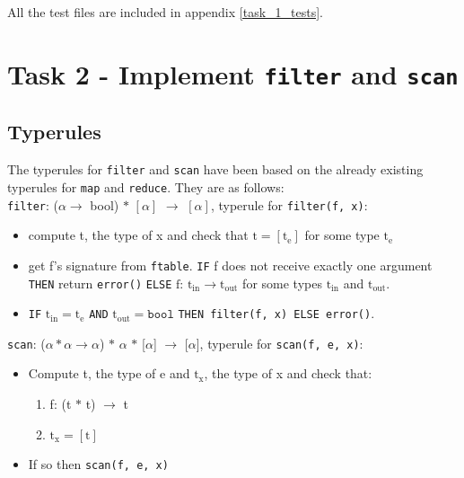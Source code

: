 \documentclass[11pt]{article}
\begin{document}
    All the test files are included in appendix \ref{task_1_tests}.

    \section{Task 2 - Implement \texttt{filter} and \texttt{scan}}
    \subsection{Typerules}
    The typerules for \texttt{filter} and \texttt{scan} have been based on the
    already existing typerules for \texttt{map} and \texttt{reduce}. They are as
    follows: \\

    \texttt{filter}: ($\alpha \rightarrow$ bool) $\ast$ $[\alpha]$ $\rightarrow$
    $[\alpha]$, typerule for \texttt{filter(f, x)}:
    \vspace{-2.5mm}
    \begin{itemize}[noitemsep]
        \item compute t, the type of x and check that $\text{t} =
            [\text{t}_\text{e}]$ for some type $\text{t}_\text{e}$
        \item get f's signature from \texttt{ftable}. \texttt{IF} f does not
            receive exactly one argument \texttt{THEN} return \texttt{error()}
            \texttt{ELSE} $\text{f: t}_{\text{in}} \rightarrow
            \text{t}_{\text{out}}$ for some types $\text{t}_{\text{in}}$ and
            $\text{t}_{\text{out}}$.
        \item \texttt{IF} $\text{t}_{\text{in}} = \text{t}_\text{e}$
            \texttt{AND} $\text{t}_{\text{out}} = \texttt{bool}$ \texttt{THEN
            filter(f, x) ELSE error()}.
    \end{itemize}

    \texttt{scan}: ($\alpha \ast \alpha \rightarrow \alpha$) $\ast$ $\alpha$
    $\ast$ [$\alpha$] $\rightarrow$ [$\alpha$], typerule for
    \texttt{scan(f, e, x)}:
    \vspace{-2.5mm}
    \begin{itemize}[noitemsep]
        \item Compute t, the type of e and $\text{t}_\text{x}$, the type of x
            and check that:
        	\begin{enumerate}[noitemsep]
        	   \item f: (t $\ast$ t) $\rightarrow$ t
        	   \item $\text{t}_\text{x} = [\text{t}]$
    		\end{enumerate}
        \item If so then \texttt{scan(f, e, x)}
    \end{itemize}
\end{document}

